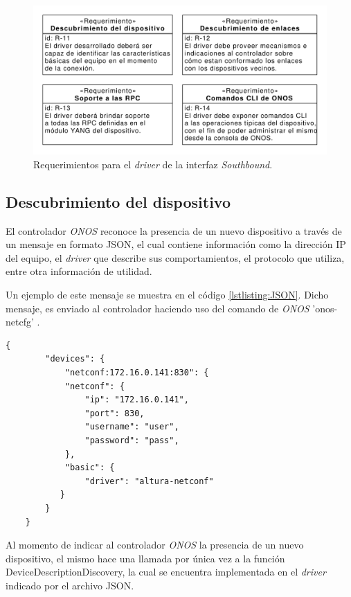   \begin{figure}[H]
    \centering
    \includegraphics[scale=0.65]{Figures/req_driver.pdf}
    \caption{Requerimientos para el \textit{driver} de la interfaz \textit{Southbound}.}
    \label{fig:req_driver}
  \end{figure}

  \subsection{Descubrimiento del dispositivo}
  El controlador \textit{ONOS} reconoce la presencia de un nuevo dispositivo a través de un mensaje en formato JSON, el cual contiene información como la dirección IP del equipo, el \textit{driver} que describe sus comportamientos, el protocolo que utiliza, entre otra información de utilidad. 
  
  Un ejemplo de este mensaje se muestra en el código \ref{lstlisting:JSON}. Dicho mensaje, es enviado al controlador haciendo uso del comando de \textit{ONOS} 'onos-netcfg' \parencite{onosconfserv}.

  \begin{lstlisting}[language=SHELXL, caption=Mensaje JSON con información del dispositivo., label=lstlisting:JSON]
    {
        "devices": {
            "netconf:172.16.0.141:830": {
            "netconf": {
                "ip": "172.16.0.141",
                "port": 830,
                "username": "user",
                "password": "pass",
            },
            "basic": {
                "driver": "altura-netconf"
           }
        }
    }
    \end{lstlisting}


    Al momento de indicar al controlador \textit{ONOS} la presencia de un nuevo dispositivo, el mismo hace una llamada por única vez a la función DeviceDescriptionDiscovery, la cual se encuentra implementada en el \textit{driver} indicado por el archivo JSON. 

